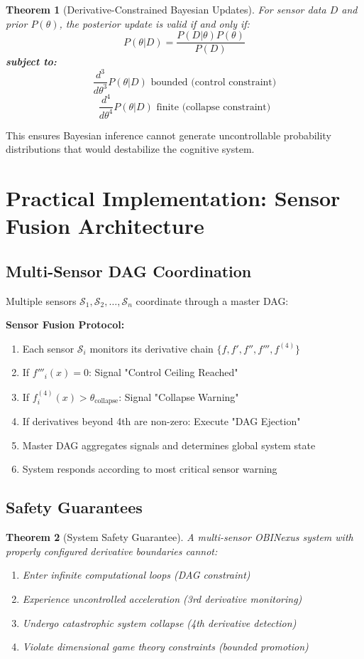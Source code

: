 \documentclass[11pt]{article}
\newtheorem{theorem}{Theorem}
\begin{document}
\begin{theorem}[Derivative-Constrained Bayesian Updates]
For sensor data $D$ and prior $P(\theta)$, the posterior update is valid if and only if:
$$P(\theta|D) = \frac{P(D|\theta)P(\theta)}{P(D)}$$
\textbf{subject to:}
$$\frac{d^3}{d\theta^3} P(\theta|D) \text{ bounded (control constraint)}$$
$$\frac{d^4}{d\theta^4} P(\theta|D) \text{ finite (collapse constraint)}$$
\end{theorem}

This ensures Bayesian inference cannot generate uncontrollable probability distributions that would destabilize the cognitive system.

\section{Practical Implementation: Sensor Fusion Architecture}

\subsection{Multi-Sensor DAG Coordination}

Multiple sensors $\mathcal{S}_1, \mathcal{S}_2, \ldots, \mathcal{S}_n$ coordinate through a master DAG:

\begin{algorithm}
\textbf{Sensor Fusion Protocol:}
\begin{enumerate}
\item Each sensor $\mathcal{S}_i$ monitors its derivative chain $\{f, f', f'', f''', f^{(4)}\}$
\item If $f'''_i(x) = 0$: Signal "Control Ceiling Reached"
\item If $f^{(4)}_i(x) > \theta_{\text{collapse}}$: Signal "Collapse Warning"  
\item If derivatives beyond 4th are non-zero: Execute "DAG Ejection"
\item Master DAG aggregates signals and determines global system state
\item System responds according to most critical sensor warning
\end{enumerate}
\end{algorithm}

\subsection{Safety Guarantees}

\begin{theorem}[System Safety Guarantee]
A multi-sensor OBINexus system with properly configured derivative boundaries cannot:
\begin{enumerate}
\item Enter infinite computational loops (DAG constraint)
\item Experience uncontrolled acceleration (3rd derivative monitoring)
\item Undergo catastrophic system collapse (4th derivative detection)
\item Violate dimensional game theory constraints (bounded promotion)
\end{enumerate}
\end{theorem}
\end{document}
